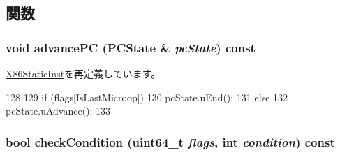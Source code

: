 \subsection{関数}
\hypertarget{classX86ISA_1_1X86MicroopBase_af04cd01429462d48e635f3e01ced6257}{
\subsubsection[{advancePC}]{\setlength{\rightskip}{0pt plus 5cm}void advancePC ({\bf PCState} \& {\em pcState}) const}}
\label{classX86ISA_1_1X86MicroopBase_af04cd01429462d48e635f3e01ced6257}


\hyperlink{classX86ISA_1_1X86StaticInst_af04cd01429462d48e635f3e01ced6257}{X86StaticInst}を再定義しています。


\begin{DoxyCode}
128         {
129             if (flags[IsLastMicroop])
130                 pcState.uEnd();
131             else
132                 pcState.uAdvance();
133         }
\end{DoxyCode}
\hypertarget{classX86ISA_1_1X86MicroopBase_a833205937b579b8b3fa163faba5056ce}{
\subsubsection[{checkCondition}]{\setlength{\rightskip}{0pt plus 5cm}bool checkCondition (uint64\_\-t {\em flags}, \/  int {\em condition}) const}}
\label{classX86ISA_1_1X86MicroopBase_a833205937b579b8b3fa163faba5056ce}



